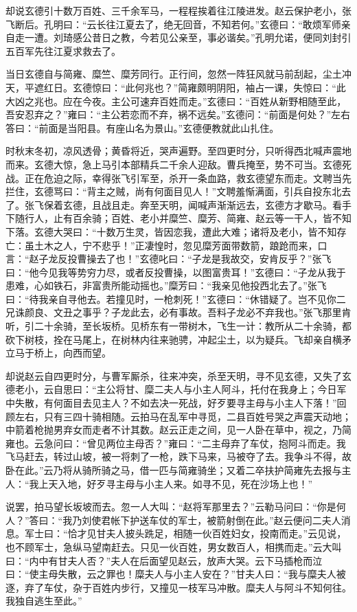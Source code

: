 却说玄德引十数万百姓、三千余军马，一程程挨着往江陵进发。赵云保护老小，张飞断后。孔明曰：“云长往江夏去了，绝无回音，不知若何。”玄德曰：“敢烦军师亲自走一遭。刘琦感公昔日之教，今若见公亲至，事必谐矣。”孔明允诺，便同刘封引五百军先往江夏求救去了。

当日玄德自与简雍、糜竺、糜芳同行。正行间，忽然一阵狂风就马前刮起，尘土冲天，平遮红日。玄德惊曰：“此何兆也？”简雍颇明阴阳，袖占一课，失惊曰：“此大凶之兆也。应在今夜。主公可速弃百姓而走。”玄德曰：“百姓从新野相随至此，吾安忍弃之？”雍曰：“主公若恋而不弃，祸不远矣。”玄德问：“前面是何处？”左右答曰：“前面是当阳县。有座山名为景山。”玄德便教就此山扎住。

时秋末冬初，凉风透骨；黄昏将近，哭声遍野。至四更时分，只听得西北喊声震地而来。玄德大惊，急上马引本部精兵二千余人迎敌。曹兵掩至，势不可当。玄德死战。正在危迫之际，幸得张飞引军至，杀开一条血路，救玄德望东而走。文聘当先拦住，玄德骂曰：“背主之贼，尚有何面目见人！”文聘羞惭满面，引兵自投东北去了。张飞保着玄德，且战且走。奔至天明，闻喊声渐渐远去，玄德方才歇马。看手下随行人，止有百余骑；百姓、老小并糜竺、糜芳、简雍、赵云等一干人，皆不知下落。玄德大哭曰：“十数万生灵，皆因恋我，遭此大难；诸将及老小，皆不知存亡：虽土木之人，宁不悲乎！”正凄惶时，忽见糜芳面带数箭，踉跄而来，口言：“赵子龙反投曹操去了也！”玄德叱曰：“子龙是我故交，安肯反乎？”张飞曰：“他今见我等势穷力尽，或者反投曹操，以图富贵耳！”玄德曰：“子龙从我于患难，心如铁石，非富贵所能动摇也。”糜芳曰：“我亲见他投西北去了。”张飞曰：“待我亲自寻他去。若撞见时，一枪刺死！”玄德曰：“休错疑了。岂不见你二兄诛颜良、文丑之事乎？子龙此去，必有事故。吾料子龙必不弃我也。”张飞那里肯听，引二十余骑，至长坂桥。见桥东有一带树木，飞生一计：教所从二十余骑，都砍下树枝，拴在马尾上，在树林内往来驰骋，冲起尘土，以为疑兵。飞却亲自横矛立马于桥上，向西而望。

却说赵云自四更时分，与曹军厮杀，往来冲突，杀至天明，寻不见玄德，又失了玄德老小，云自思曰：“主公将甘、糜二夫人与小主人阿斗，托付在我身上；今日军中失散，有何面目去见主人？不如去决一死战，好歹要寻主母与小主人下落！”回顾左右，只有三四十骑相随。云拍马在乱军中寻觅，二县百姓号哭之声震天动地；中箭着枪抛男弃女而走者不计其数。赵云正走之间，见一人卧在草中，视之，乃简雍也。云急问曰：“曾见两位主母否？”雍曰：“二主母弃了车仗，抱阿斗而走。我飞马赶去，转过山坡，被一将刺了一枪，跌下马来，马被夺了去。我争斗不得，故卧在此。”云乃将从骑所骑之马，借一匹与简雍骑坐；又着二卒扶护简雍先去报与主人：“我上天入地，好歹寻主母与小主人来。如寻不见，死在沙场上也！”

说罢，拍马望长坂坡而去。忽一人大叫：“赵将军那里去？”云勒马问曰：“你是何人？”答曰：“我乃刘使君帐下护送车仗的军士，被箭射倒在此。”赵云便问二夫人消息。军士曰：“恰才见甘夫人披头跣足，相随一伙百姓妇女，投南而走。”云见说，也不顾军士，急纵马望南赶去。只见一伙百姓，男女数百人，相携而走。”云大叫曰：“内中有甘夫人否？”夫人在后面望见赵云，放声大哭。云下马插枪而泣曰：“使主母失散，云之罪也！糜夫人与小主人安在？”甘夫人曰：“我与糜夫人被逐，弃了车仗，杂于百姓内步行，又撞见一枝军马冲散。糜夫人与阿斗不知何往。我独自逃生至此。”


